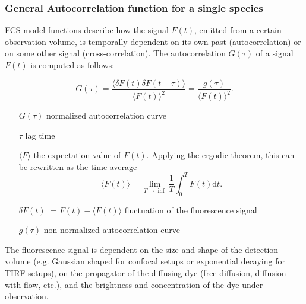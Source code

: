 	\subsubsection{General Autocorrelation function for a single species}
	FCS model functions describe how the signal $F(t)$, emitted from a certain observation volume, is temporally dependent on its own past (autocorrelation) or on some other signal (cross-correlation). The autocorrelation $G(\tau)$ of a signal $F(t)$ is computed as follows:
	\newline
	\newline
	\begin{minipage}{\textwidth}
	\begin{equation}
	G(\tau) = \frac{\langle \delta F(t) \delta F(t+\tau) \rangle}{\langle F(t) \rangle^2} = \frac{g(\tau)}{\langle F(t) \rangle^2}.
	\end{equation}
	\begin{itemize} \small
	\item[$G(\tau)$] normalized autocorrelation curve
	\item[$\tau$] lag time
	\item[$\langle F \rangle$] the expectation value of $F(t)$. Applying the ergodic theorem, this can be rewritten as the time average \[ \langle F(t) \rangle = \lim_{T \rightarrow \inf }\frac{1}{T} \int_0^T F(t) \mathrm{d}t. \]	
	\item[$\delta F(t)$] $= F(t) - \langle F(t) \rangle$ fluctuation of the fluorescence signal
	\item[$g(\tau)$] non normalized autocorrelation curve
	\end{itemize}
	\end{minipage}
	\newline
	\newline
	\newline
	The fluorescence signal is dependent on the size and shape of the detection volume (e.g. Gaussian shaped for confocal setups or exponential decaying for TIRF setups), on the propagator of the diffusing dye (free diffusion, diffusion with flow, etc.), and the brightness and concentration of the dye under observation\cite{Burkhardt2010}.  \\
	\newline

